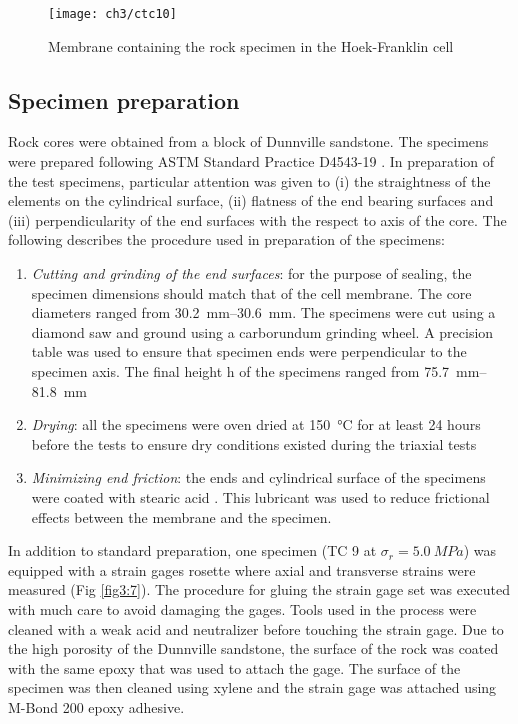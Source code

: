 \begin{figure}[tb]
    \centering
    \texttt{[image: ch3/ctc10]}
    \caption{Membrane containing the rock specimen in the Hoek-Franklin cell}
    \label{fig3:6}
\end{figure} 

\subsection{Specimen preparation} \label{ch3:specimen-prep}

Rock cores were obtained from a block of Dunnville sandstone. The specimens were prepared following ASTM Standard Practice D4543-19 \cite{ASTM2019}. In preparation of the test specimens, particular attention was given to (i) the straightness of the elements on the cylindrical surface, (ii) flatness of the end bearing surfaces and (iii) perpendicularity of the end surfaces with the respect to axis of the core. The following describes the procedure used in preparation of the specimens:

\begin{enumerate}
    \item \emph{Cutting and grinding of the end surfaces}: for the purpose of sealing, the specimen dimensions should match that of the cell membrane. The core diameters ranged from \SIrange{30.2}{30.6}{mm}. The specimens were cut using a diamond saw and ground using a carborundum grinding wheel. A precision table was used to ensure that specimen ends were perpendicular to the specimen axis. The final height h of the specimens ranged from \SIrange{75.7}{81.8}{mm} 
    \item \emph{Drying}: all the specimens were oven dried at \SI{150}{\celsius} for at least 24 hours before the tests to ensure dry conditions existed during the triaxial tests
    \item \emph{Minimizing end friction}: the ends and cylindrical surface of the specimens were coated with stearic acid \cite{ASTM2019}. This lubricant was used to reduce frictional effects between the membrane and the specimen.
\end{enumerate}

In addition to standard preparation, one specimen (TC 9 at $\sigma_r = \SI{5.0}{MPa}$) was equipped with a strain gages rosette where axial and transverse strains were measured (Fig \ref{fig3:7}). The procedure for gluing the strain gage set was executed with much care to avoid damaging the gages. Tools used in the process were cleaned with a weak acid and neutralizer before touching the strain gage. Due to the high porosity of the Dunnville sandstone, the surface of the rock was coated with the same epoxy that was used to attach the gage. The surface of the specimen was then cleaned using xylene and the strain gage was attached using M-Bond 200 epoxy adhesive.

